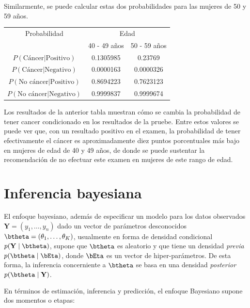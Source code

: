 \begin{Eje}
Similarmente, se puede calcular estas dos probabilidades para las mujeres de 50 y 59 años.
\begin{table}[!h]
\centering
  \begin{tabular}{|c|c|c|}\hline
  Probabilidad&\multicolumn{2}{|c|}{Edad}\\\cline{2-3}
  &40 - 49 años&50 - 59 años\\\hline
  $P(\text{Cáncer}|\text{Positivo})$&0.1305985&0.23769\\
  $P(\text{Cáncer}|\text{Negativo})$&0.0000163&0.0000326\\
  $P(\text{No cáncer}|\text{Positivo})$&0.8694223&0.7623123\\
  $P(\text{No cáncer}|\text{Negativo})$&0.9999837&0.9999674\\\hline
  \end{tabular}
\end{table}
Los resultados de la anterior tabla muestran cómo se cambia la probabilidad de tener cancer condicionado en los resultados de la pruebe. Entre estos valores se puede ver que, con un resultado positivo en el examen, la probabilidad de tener efectivamente el cáncer es aproximadamente diez puntos porcentuales más bajo en mujeres de edad de 40 y 49 años, de donde se puede sustentar la recomendación de no efectuar este examen en mujeres de este rango de edad.
\end{Eje}

\section{Inferencia bayesiana}

El enfoque bayesiano, además de especificar un modelo para los datos observados $\mathbf{Y}=(y_1,\ldots,y_n)$ dado un vector de parámetros desconocidos $\btheta=(\theta_1,\ldots,\theta_K)$, usualmente en forma de densidad condicional  $p(\mathbf{Y} \mid \btheta)$, supone que $\btheta$ es aleatorio y que tiene un densidad \emph{previa} $p(\btheta \mid \bEta)$, donde $\bEta$ es un vector de hiper-parámetros. De esta forma, la inferencia concerniente a $\btheta$ se basa en una densidad \emph{posterior} $p(\btheta \mid \mathbf{Y})$.

En términos de estimación, inferencia y predicción, el enfoque Bayesiano supone dos momentos o etapas:

